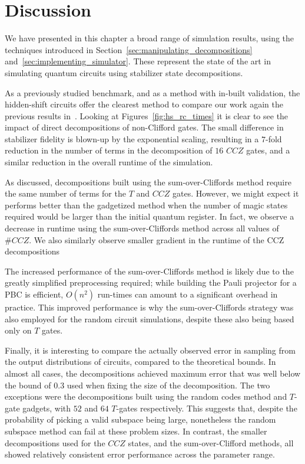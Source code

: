 \section{Discussion}
We have presented in this chapter a broad range of simulation results, using the techniques introduced in Section~\ref{sec:manipulating_decompositions} and~\ref{sec:implementing_simulator}. These represent the state of the art in simulating quantum circuits using stabilizer state decompositions.\par
As a previously studied benchmark, and as a method with in-built validation, the hidden-shift circuits offer the clearest method to compare our work again the previous results in~\cite{Bravyi2016}. Looking at Figures~\ref{fig:hs_rc_times} it is clear to see the impact of direct decompositions of non-Clifford gates. The small difference in stabilizer fidelity is blown-up by the exponential scaling, resulting in a $7$-fold reduction in the number of terms in the decomposition of $16$ $CCZ$ gates, and a similar reduction in the overall runtime of the simulation.\par
As discussed, decompositions built using the sum-over-Cliffords method require the same number of terms for the $T$ and $CCZ$ gates. However, we might expect it performs better than the gadgetized method when the number of magic states required would be larger than the initial quantum register. In fact, we observe a decrease in runtime using the sum-over-Cliffords method across all values of $\# CCZ$. We also similarly observe smaller gradient in the runtime of the CCZ decompositions\par
The increased performance of the sum-over-Cliffords method is likely due to the greatly simplified preprocessing required; while building the Pauli projector for a PBC is efficient, $O(n^{2})$ run-times can amount to a significant overhead in practice. This improved performance is why the sum-over-Cliffords strategy was also employed for the random circuit simulations, despite these also being based only on $T$ gates.\par
Finally, it is interesting to compare the actually observed error in sampling from the output distributions of circuits, compared to the theoretical bounds. In almost all cases, the decompositions achieved maximum error that was well below the bound of $0.3$ used when fixing the size of the decomposition. The two exceptions were the decompositions built using the random codes method and $T$-gate gadgets, with $52$ and $64$ $T$-gates respectively. This suggests that, despite the probability of picking a valid subspace being large, nonetheless the random subspace method can fail at these problem sizes. In contrast, the smaller decompositions used for the $CCZ$ states, and the sum-over-Clifford methods, all showed relatively consistent error performance across the parameter range.\par
